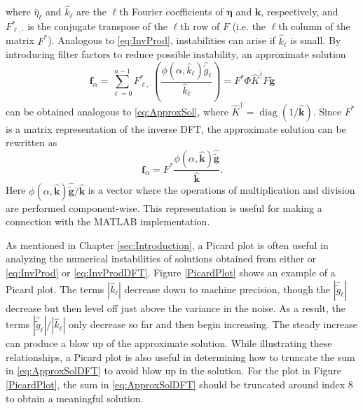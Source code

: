 \documentclass[12pt,notitlepage]{report}
\newcommand{\gnoise}{\widetilde{g}}	%
\newcommand{\gnoiseVec}{\widetilde{\mathbf{g}}}	%
\newcommand{\kVec}{\mathbf{k}}	%
\newcommand{\kMat}{K}	%
\newcommand{\fVec}{\mathbf{f}}	%
\newcommand{\ctrans}{*}	%
\DeclareMathOperator{\diag}{diag}	%
\newcommand{\regparam}{\alpha}
\newcommand{\filt}{\phi}
\newcommand{\noise}{\eta}	%
\newcommand{\noiseVec}{\bm{\noise}}	%
\begin{document}
where $\widehat{\noise}_\ell$ and $\widehat{k}_\ell$ are the $\ell$th Fourier coefficients of $\noiseVec$ and $\kVec$, respectively, and $F^\ctrans_{\ell,\cdot}$ is the conjugate transpose of the $\ell$th row of $F$ (i.e. the $\ell$th column of the matrix $F^\ctrans$). Analogous to \eqref{eq:InvProd}, instabilities can arise if $\widehat{k}_\ell$ is small. By introducing filter factors to reduce possible instability, an approximate solution
\begin{equation}
\fVec_\regparam = \sum_{\ell = 0}^{n-1} F^\ctrans_{\ell,\cdot}\left(\frac{\filt(\regparam,\widehat{k}_\ell)\widehat{\gnoise}_\ell}{\widehat{k}_\ell}\right) = F^\ctrans\Phi\widehat{\kMat}^\dagger F\gnoiseVec
\label{eq:ApproxSolDFT}
\end{equation}
can be obtained analogous to \eqref{eq:ApproxSol}, where $\widehat{\kMat}^\dagger = \diag(1/\widehat{\kVec})$.
Since $F^\ctrans$ is a matrix representation of the inverse DFT, the approximate solution can be rewritten as
\[\fVec_\regparam = F^\ctrans \frac{\filt(\regparam,\widehat{\kVec})\widehat{\gnoiseVec}}{\widehat{\kVec}}.\]
Here $\filt(\regparam,\widehat{\kVec})\widehat{\gnoiseVec}/{\widehat{\kVec}}$ is a vector where the operations of multiplication and division are performed component-wise. This representation is useful for making a connection with the MATLAB implementation. \par
As mentioned in Chapter \ref{sec:Introduction}, a Picard plot is often useful in analyzing the numerical instabilities of solutions obtained from either or \eqref{eq:InvProd} or \eqref{eq:InvProdDFT}. Figure \ref{PicardPlot} shows an example of a Picard plot. The terms $|\widehat{k}_\ell|$ decrease down to machine precision, though the $|\widehat{\gnoise}_\ell|$ decrease but then level off just above the variance in the noise. As a result, the terms $|\widehat{\gnoise}_\ell|/|\widehat{k}_\ell|$ only decrease so far and then begin increasing. The steady increase can produce a blow up of the approximate solution. While illustrating these relationships, a Picard plot is also useful in determining how to truncate the sum in \eqref{eq:ApproxSolDFT} to avoid blow up in the solution. For the plot in Figure \ref{PicardPlot}, the sum in \eqref{eq:ApproxSolDFT} should be truncated around index 8 to obtain a meaningful solution. \par 
\end{document}
